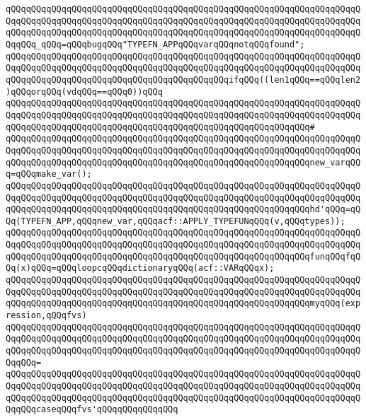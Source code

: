 \verb|qQQqqQQqqQQqqQQqqQQqqQQqqQQqqQQqqQQqqQQqqQQqqQQqqQQqqQQqqQQqqQQqqQQqqQQqqQQqqQQqqQQqqQQqqQQqqQQqqQQqqQQqqQQqqQQqqQQqqQQqqQQqqQQqqQQqqQQqqQQqqQQqqQQqqQQqqQQqqQQqqQQqqQQqqQQqqQQqqQQqqQQqqQQqqQQqqQQqqQQqqQQqqQQqqQQqqQQq_qQQq=qQQqbugqQQq"TYPEFN_APPqQQqvarqQQqnotqQQqfound";|\newline
\newline
\verb|qQQqqQQqqQQqqQQqqQQqqQQqqQQqqQQqqQQqqQQqqQQqqQQqqQQqqQQqqQQqqQQqqQQqqQQqqQQqqQQqqQQqqQQqqQQqqQQqqQQqqQQqqQQqqQQqqQQqqQQqqQQqqQQqqQQqqQQqqQQqqQQqqQQqqQQqqQQqqQQqqQQqqQQqqQQqqQQqqQQqqQQqifqQQq((len1qQQq==qQQqlen2)qQQqorqQQq(vdqQQq==qQQq0))qQQq|\newline
\verb|qQQqqQQqqQQqqQQqqQQqqQQqqQQqqQQqqQQqqQQqqQQqqQQqqQQqqQQqqQQqqQQqqQQqqQQqqQQqqQQqqQQqqQQqqQQqqQQqqQQqqQQqqQQqqQQqqQQqqQQqqQQqqQQqqQQqqQQqqQQqqQQqqQQqqQQqqQQqqQQqqQQqqQQqqQQqqQQqqQQqqQQqqQQqqQQqqQQqqQQq#|\newline
\verb|qQQqqQQqqQQqqQQqqQQqqQQqqQQqqQQqqQQqqQQqqQQqqQQqqQQqqQQqqQQqqQQqqQQqqQQqqQQqqQQqqQQqqQQqqQQqqQQqqQQqqQQqqQQqqQQqqQQqqQQqqQQqqQQqqQQqqQQqqQQqqQQqqQQqqQQqqQQqqQQqqQQqqQQqqQQqqQQqqQQqqQQqqQQqqQQqqQQqqQQqnew_varqQQq=qQQqmake_var();|\newline
\verb|qQQqqQQqqQQqqQQqqQQqqQQqqQQqqQQqqQQqqQQqqQQqqQQqqQQqqQQqqQQqqQQqqQQqqQQqqQQqqQQqqQQqqQQqqQQqqQQqqQQqqQQqqQQqqQQqqQQqqQQqqQQqqQQqqQQqqQQqqQQqqQQqqQQqqQQqqQQqqQQqqQQqqQQqqQQqqQQqqQQqqQQqqQQqqQQqqQQqqQQqhd'qQQq=qQQq(TYPEFN_APP,qQQqnew_var,qQQqacf::APPLY_TYPEFUNqQQq(v,qQQqtypes));|\newline
\verb|qQQqqQQqqQQqqQQqqQQqqQQqqQQqqQQqqQQqqQQqqQQqqQQqqQQqqQQqqQQqqQQqqQQqqQQqqQQqqQQqqQQqqQQqqQQqqQQqqQQqqQQqqQQqqQQqqQQqqQQqqQQqqQQqqQQqqQQqqQQqqQQqqQQqqQQqqQQqqQQqqQQqqQQqqQQqqQQqqQQqqQQqqQQqqQQqqQQqqQQqfunqQQqfqQQq(x)qQQq=qQQqloopcqQQqdictionaryqQQq(acf::VARqQQqx);|\newline
\newline
\verb|qQQqqQQqqQQqqQQqqQQqqQQqqQQqqQQqqQQqqQQqqQQqqQQqqQQqqQQqqQQqqQQqqQQqqQQqqQQqqQQqqQQqqQQqqQQqqQQqqQQqqQQqqQQqqQQqqQQqqQQqqQQqqQQqqQQqqQQqqQQqqQQqqQQqqQQqqQQqqQQqqQQqqQQqqQQqqQQqqQQqqQQqqQQqqQQqqQQqqQQqmyqQQq(expression,qQQqfvs)|\newline
\verb|qQQqqQQqqQQqqQQqqQQqqQQqqQQqqQQqqQQqqQQqqQQqqQQqqQQqqQQqqQQqqQQqqQQqqQQqqQQqqQQqqQQqqQQqqQQqqQQqqQQqqQQqqQQqqQQqqQQqqQQqqQQqqQQqqQQqqQQqqQQqqQQqqQQqqQQqqQQqqQQqqQQqqQQqqQQqqQQqqQQqqQQqqQQqqQQqqQQqqQQqqQQqqQQqqQQqqQQq=|\newline
\verb|qQQqqQQqqQQqqQQqqQQqqQQqqQQqqQQqqQQqqQQqqQQqqQQqqQQqqQQqqQQqqQQqqQQqqQQqqQQqqQQqqQQqqQQqqQQqqQQqqQQqqQQqqQQqqQQqqQQqqQQqqQQqqQQqqQQqqQQqqQQqqQQqqQQqqQQqqQQqqQQqqQQqqQQqqQQqqQQqqQQqqQQqqQQqqQQqqQQqqQQqqQQqqQQqqQQqqQQqcaseqQQqfvs'qQQqqQQqqQQqqQQq|\newline
